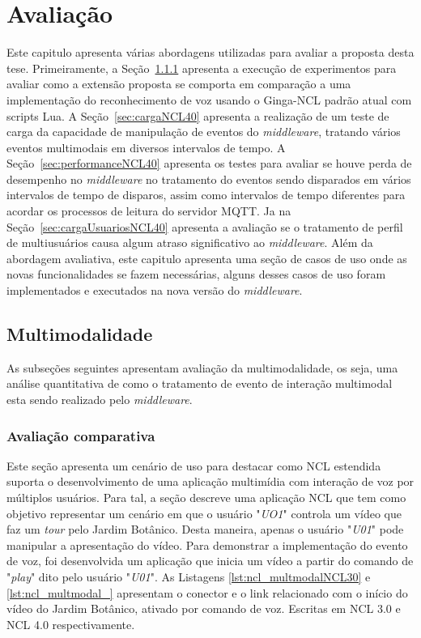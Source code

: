 \chapter{Avaliação} \label{cap:cap6}

Este capitulo apresenta várias abordagens utilizadas para avaliar a proposta desta tese. Primeiramente, a Seção~\ref{sec:CompNCL30} apresenta a execução de experimentos para avaliar como a extensão proposta se comporta em comparação a uma implementação do reconhecimento de voz usando o Ginga-NCL padrão atual com scripts Lua. A Seção~\ref{sec:cargaNCL40} apresenta a realização de um teste de carga da capacidade de manipulação de eventos do \textit{middleware}, tratando vários eventos multimodais em diversos intervalos de tempo. A Seção~\ref{sec:performanceNCL40} apresenta os testes para avaliar se houve perda de desempenho no \textit{middleware} no tratamento do eventos sendo disparados em vários intervalos de tempo de disparos, assim como intervalos de tempo diferentes para acordar os processos de leitura do servidor MQTT. Ja na Seção~\ref{sec:cargaUsuariosNCL40} apresenta a avaliação se o tratamento de perfil de multiusuários causa algum atraso significativo ao \textit{middleware}.  Além da abordagem avaliativa, este capitulo apresenta uma seção de casos de uso onde as novas funcionalidades se fazem necessárias, alguns desses casos de uso foram implementados e executados na nova versão do \textit{middleware}.

\section{Multimodalidade}\label{sec:AvMultimodalidade}

As subseções seguintes apresentam avaliação da multimodalidade, os seja, uma análise quantitativa de como o tratamento de evento de interação multimodal esta sendo realizado pelo \textit{middleware}.

\subsection{Avaliação comparativa} \label{sec:CompNCL30}

Este seção apresenta um cenário de uso para destacar como NCL estendida suporta o desenvolvimento de uma aplicação multimídia com interação de voz por múltiplos usuários. Para tal, a seção descreve uma aplicação NCL que tem como objetivo representar um cenário em que o usuário "\textit{UO1}" controla um vídeo que faz um \textit{tour} pelo Jardim Botânico. Desta maneira, apenas o usuário "\textit{U01}" pode manipular a apresentação do vídeo. Para demonstrar a implementação do evento de voz, foi desenvolvida um aplicação que inicia um vídeo a partir do comando de "\textit{play}" dito pelo usuário "\textit{U01}". As Listagens \ref{lst:ncl_multmodalNCL30} e \ref{lst:ncl_multmodal_} apresentam o conector e o link relacionado com o início do vídeo do Jardim Botânico, ativado por comando de voz. Escritas em NCL 3.0 e NCL 4.0 respectivamente.

